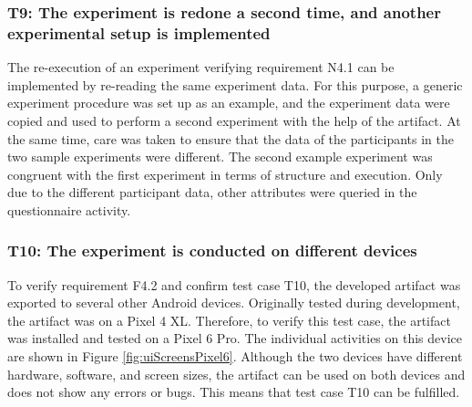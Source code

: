 


\newpage

\subsubsection*{T9: The experiment is redone a second time, and another experimental setup is implemented}

The re-execution of an experiment verifying requirement N4.1 can be implemented by re-reading the same experiment data. For this purpose, a generic experiment procedure was set up as an example, and the experiment data were copied and used to perform a second experiment with the help of the artifact. At the same time, care was taken to ensure that the data of the participants in the two sample experiments were different. The second example experiment was congruent with the first experiment in terms of structure and execution. Only due to the different participant data, other attributes were queried in the questionnaire activity.

\newpage

\subsubsection*{T10: The experiment is conducted on different devices}

To verify requirement F4.2 and confirm test case T10, the developed artifact was exported to several other Android devices. Originally tested during development, the artifact was on a Pixel 4 XL. Therefore, to verify this test case, the artifact was installed and tested on a Pixel 6 Pro. The individual activities on this device are shown in Figure \ref{fig:uiScreensPixel6}. Although the two devices have different hardware, software, and screen sizes, the artifact can be used on both devices and does not show any errors or bugs. This means that test case T10 can be fulfilled.



